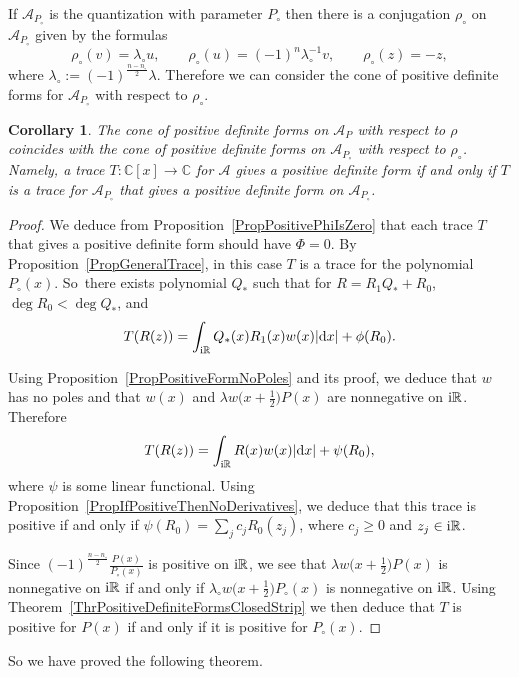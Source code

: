 \documentclass[pdftex]{sigma}
\newcommand{\RN}{\mathbb{R}} %
\newcommand{\CN}{\mathbb{C}} %
\newcommand{\mc}[1]{\mathcal{#1}}
\newtheorem{Corollary}[Theorem]{Corollary}
\theoremstyle{definition}
\numberwithin{equation}{section}
\begin{document}
If $\mc{A}_{P_\circ}$ is the quantization with parameter $P_\circ$ then there is a conjugation $\rho_\circ$ on $\mc{A}_{P_\circ}$ given by the formulas
\[
\rho_\circ(v)=\lambda_\circ u,\qquad \rho_\circ(u)=(-1)^n \lambda_\circ^{-1}v,\qquad \rho_\circ(z)=-z,
\]
where $\lambda_\circ:=(-1)^{\frac{n-n_\circ}{2}}\lambda$. Therefore we can consider the cone of positive definite forms for $\mc{A}_{P_\circ}$ with respect to $\rho_\circ$.
\begin{Corollary}
The cone of positive definite forms on $\mc{A}_P$ with respect to $\rho$ coincides with the cone of positive definite forms on $\mc{A}_{P_\circ}$ with respect to $\rho_\circ$. Namely, a trace $T\colon \CN[x]\to \CN$ for $\mc{A}$ gives a positive definite form if and only if $T$ is a trace for $\mc{A}_{P_\circ}$ that gives a positive definite form on $\mc{A}_{P_\circ}$.
\end{Corollary}
\begin{proof}
We deduce from Proposition~\ref{PropPositivePhiIsZero} that each trace $T$ that gives a positive definite form should have $\Phi=0$. By Proposition~\ref{PropGeneralTrace}, in this case $T$ is a trace for the polynomial $P_\circ(x)$. So~there exists polynomial $Q_*$ such that for $R=R_1Q_*+R_0$, $\deg R_0<\deg Q_*$, and
\[
T(R(z))=\int_{{\rm i}\RN} Q_*(x)R_1(x)w(x) |{\rm d}x|+\phi(R_0).
\]

Using Proposition~\ref{PropPositiveFormNoPoles} and its proof, we deduce that $w$ has no poles and that $w(x)$ and $\lambda w\big(x+\frac{1}{2}\big)P(x)$ are nonnegative on ${\rm i}\RN$. Therefore
\[
T(R(z))=\int_{{\rm i}\RN} R(x) w(x) |{\rm d}x|+\psi(R_0),
\]
where $\psi$ is some linear functional. Using Proposition~\ref{PropIfPositiveThenNoDerivatives}, we deduce that this trace is positive if and only if $\psi(R_0)=\sum_j c_j R_0(z_j)$, where $c_j\geq 0$ and $z_j\in {\rm i}\mathbb R$.

Since $(-1)^{\frac{n-n_\circ}{2}}\frac{P(x)}{P_\circ(x)}$ is positive on ${\rm i}\RN$, we see that $\lambda w\big(x+\frac{1}{2}\big)P(x)$ is nonnegative on ${\rm i}\RN$ if and only if $\lambda_\circ w\big(x+\frac{1}{2}\big)P_\circ(x)$ is nonnegative on ${\rm i}\RN$. Using Theorem~\ref{ThrPositiveDefiniteFormsClosedStrip} we then deduce that $T$ is positive for $P(x)$ if and only if it is positive for $P_\circ(x)$.
\end{proof}
So we have proved the following theorem.
\end{document}
